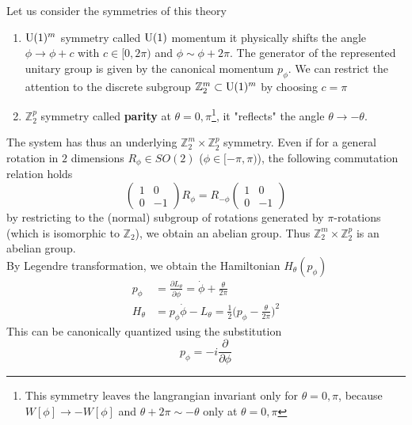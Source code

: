Let us consider the symmetries of this theory
\begin{enumerate}
    \item $\mathrm{U}(1)^m$ symmetry called $\mathrm{U}(1)$ momentum it physically shifts the angle $\phi \to \phi +c$   with $c \in [0, 2 \pi)$ and $\phi \sim \phi + 2 \pi$. The generator of the represented unitary group is given by the canonical momentum $p_{\phi}$. We can restrict the attention to the discrete subgroup $\mathbb{Z}_2^m \subset \mathrm{U}(1)^m$ by choosing $c= \pi$
	\item $\mathbb{Z}_2^p$ symmetry called \textbf{parity} at $\theta=0, \pi$\footnote{This symmetry leaves the langrangian invariant only for $\theta=0, \pi$, because $W[\phi] \to -W[\phi]$ and $\theta + 2 \pi \sim - \theta$ only at $\theta =0, \pi$}, it "reflects" the angle $ \theta \to - \theta$. 
\end{enumerate}
The system has thus an underlying $\mathbb{Z}_2^m \times \mathbb{Z}_2^p$ symmetry. Even if for a general rotation in $2$ dimensions $R_{\phi} \in SO(2)$ ($\phi \in [-\pi, \pi)$), the following commutation relation holds
\begin{equation}
    \begin{pmatrix}
1 &0\\
0 &-1
    \end{pmatrix} R_{\phi} = R_{-\phi} \begin{pmatrix}
1 &0\\
0 &-1
    \end{pmatrix}
\end{equation}
by restricting to the (normal) subgroup of rotations generated by $\pi$-rotations (which is isomorphic to $\mathbb{Z}_2$), we obtain an abelian group. Thus $\mathbb{Z}_2^m \times \mathbb{Z}_2^p$ is an abelian group.\\
By Legendre transformation, we obtain the Hamiltonian $H_{\theta}(p_{\phi})$
\begin{equation}
     \begin{aligned}
 p_{\phi} &= \frac{\partial L_{\theta}}{\partial \Dot{\phi}} = \dot{\phi} + \frac{\theta}{2 \pi}\\
 H_{\theta} &= p_{\phi} \dot{\phi} -L_{\theta} = \frac{1}{2} \bigg( p_{\phi} - \frac{\theta}{2 \pi} \bigg)^2
     \end{aligned}
\end{equation}
This can be canonically quantized using the substitution
\begin{equation}
     p_{\phi} = - i \frac{\partial}{\partial \phi}
\end{equation}
